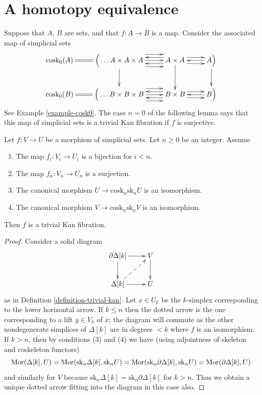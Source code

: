 \section{A homotopy equivalence}
\label{section-homotopy-equivalence}

\noindent
Suppose that $A$, $B$ are sets, and that $f : A \to B$
is a map. Consider the associated map of
simplicial sets
$$
\xymatrix{
\text{cosk}_0(A) \ar@{=}[r] &
\Big(\ldots A \times A \times A
\ar[d] \ar@<2ex>[r] \ar@<0ex>[r] \ar@<-2ex>[r] &
A \times A \ar[d] \ar@<1ex>[r] \ar@<-1ex>[r] \ar@<1ex>[l] \ar@<-1ex>[l] &
A \Big) \ar[d] \ar@<0ex>[l] \\
\text{cosk}_0(B) \ar@{=}[r] &
\Big( \ldots B \times B \times B \ar@<2ex>[r] \ar@<0ex>[r] \ar@<-2ex>[r] &
B \times B \ar@<1ex>[r] \ar@<-1ex>[r] \ar@<1ex>[l] \ar@<-1ex>[l] &
B \Big) \ar@<0ex>[l]
}
$$
See Example \ref{example-cosk0}. The case $n = 0$ of the following lemma
says that this map of simplicial sets is a trivial Kan fibration if $f$ is
surjective.

\begin{lemma}
\label{lemma-section}
Let $f : V \to U$ be a morphism of simplicial sets. Let $n \geq 0$ be an
integer. Assume
\begin{enumerate}
\item The map $f_i : V_i \to U_i$ is a bijection for $i < n$.
\item The map $f_n : V_n \to U_n$ is a surjection.
\item The canonical morphism $U \to \text{cosk}_n \text{sk}_n U$
is an isomorphism.
\item The canonical morphism $V \to \text{cosk}_n \text{sk}_n V$
is an isomorphism.
\end{enumerate}
Then $f$ is a trivial Kan fibration.
\end{lemma}

\begin{proof}
Consider a solid diagram
$$
\xymatrix{
\partial \Delta[k] \ar[r] \ar[d] & V \ar[d] \\
\Delta[k] \ar[r] \ar@{-->}[ru] & U
}
$$
as in Definition \ref{definition-trivial-kan}. Let $x \in U_k$ be
the $k$-simplex corresponding to the lower horizontal arrow.
If $k \leq n$ then the dotted arrow is the one corresponding to
a lift $y \in V_k$ of $x$; the diagram will commute as the other
nondegenerate simplices of $\Delta[k]$ are in degrees $< k$ where
$f$ is an isomorphism. If $k > n$, then by conditions (3) and (4)
we have (using adjointness of skeleton and coskeleton functors)
$$
\mathop{\mathrm{Mor}}\nolimits(\Delta[k], U) =
\mathop{\mathrm{Mor}}\nolimits(\text{sk}_n\Delta[k], \text{sk}_nU) =
\mathop{\mathrm{Mor}}\nolimits(\text{sk}_n\partial\Delta[k], \text{sk}_nU) =
\mathop{\mathrm{Mor}}\nolimits(\partial \Delta[k], U)
$$
and similarly for $V$ because
$\text{sk}_n\Delta[k] = \text{sk}_n\partial\Delta[k]$ for $k > n$.
Thus we obtain a unique dotted arrow fitting into the diagram in
this case also.
\end{proof}

